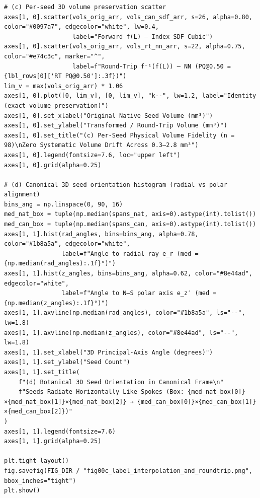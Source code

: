 \documentclass[10pt,a4paper]{article}
\renewcommand{\_}{\origunderscore\allowbreak}
\begin{document}
\begin{codebox}
\begin{lstlisting}[style=pybmed]
# (c) Per-seed 3D volume preservation scatter
axes[1, 0].scatter(vols_orig_arr, vols_can_sdf_arr, s=26, alpha=0.80, color="#0097a7", edgecolor="white", lw=0.4,
                   label="Forward f(L) — Index-SDF Cubic")
axes[1, 0].scatter(vols_orig_arr, vols_rt_nn_arr, s=22, alpha=0.75, color="#e74c3c", marker="^",
                   label=f"Round-Trip f⁻¹(f(L)) — NN (PQ@0.50 = {lbl_rows[0]['RT PQ@0.50']:.3f})")
lim_v = max(vols_orig_arr) * 1.06
axes[1, 0].plot([0, lim_v], [0, lim_v], "k--", lw=1.2, label="Identity (exact volume preservation)")
axes[1, 0].set_xlabel("Original Native Seed Volume (mm³)")
axes[1, 0].set_ylabel("Transformed / Round-Trip Volume (mm³)")
axes[1, 0].set_title("(c) Per-Seed Physical Volume Fidelity (n = 98)\nZero Systematic Volume Drift Across 0.3–2.8 mm³")
axes[1, 0].legend(fontsize=7.6, loc="upper left")
axes[1, 0].grid(alpha=0.25)

# (d) Canonical 3D seed orientation histogram (radial vs polar alignment)
bins_ang = np.linspace(0, 90, 16)
med_nat_box = tuple(np.median(spans_nat, axis=0).astype(int).tolist())
med_can_box = tuple(np.median(spans_can, axis=0).astype(int).tolist())
axes[1, 1].hist(rad_angles, bins=bins_ang, alpha=0.78, color="#1b8a5a", edgecolor="white",
                label=f"Angle to radial ray e_r (med = {np.median(rad_angles):.1f}°)")
axes[1, 1].hist(z_angles, bins=bins_ang, alpha=0.62, color="#8e44ad", edgecolor="white",
                label=f"Angle to N–S polar axis e_z′ (med = {np.median(z_angles):.1f}°)")
axes[1, 1].axvline(np.median(rad_angles), color="#1b8a5a", ls="--", lw=1.8)
axes[1, 1].axvline(np.median(z_angles), color="#8e44ad", ls="--", lw=1.8)
axes[1, 1].set_xlabel("3D Principal-Axis Angle (degrees)")
axes[1, 1].set_ylabel("Seed Count")
axes[1, 1].set_title(
    f"(d) Botanical 3D Seed Orientation in Canonical Frame\n"
    f"Seeds Radiate Horizontally Like Spokes (Box: {med_nat_box[0]}×{med_nat_box[1]}×{med_nat_box[2]} → {med_can_box[0]}×{med_can_box[1]}×{med_can_box[2]})"
)
axes[1, 1].legend(fontsize=7.6)
axes[1, 1].grid(alpha=0.25)

plt.tight_layout()
fig.savefig(FIG_DIR / "fig00c_label_interpolation_and_roundtrip.png", bbox_inches="tight")
plt.show()
\end{lstlisting}
\end{codebox}
\end{document}
